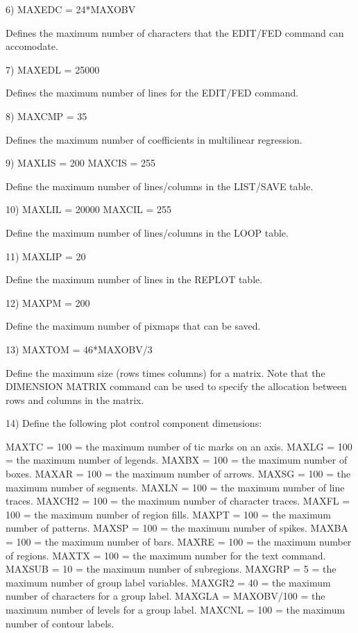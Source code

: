   6) MAXEDC   = 24*MAXOBV

     Defines the maximum number of characters that the EDIT/FED
     command can accomodate.

  7) MAXEDL   = 25000

     Defines the maximum number of lines for the EDIT/FED command.

  8) MAXCMP   = 35

     Defines the maximum number of coefficients in multilinear
     regression.

  9) MAXLIS   = 200
     MAXCIS   = 255

     Define the maximum number of lines/columns in the LIST/SAVE
     table.

 10) MAXLIL   = 20000
     MAXCIL   = 255

     Define the maximum number of lines/columns in the LOOP table.

 11) MAXLIP   = 20

     Define the maximum number of lines in the REPLOT table.

 12) MAXPM    = 200

     Define the maximum number of pixmaps that can be saved.

 13) MAXTOM   = 46*MAXOBV/3

     Define the maximum size (rows times columns) for a matrix.
     Note that the DIMENSION MATRIX command can be used to
     specify the allocation between rows and columns in the matrix.

 14) Define the following plot control component dimensions:

     MAXTC    = 100    = the maximum number of tic marks on an axis.
     MAXLG    = 100    = the maximum number of legends.
     MAXBX    = 100    = the maximum number of boxes.
     MAXAR    = 100    = the maximum number of arrows.
     MAXSG    = 100    = the maximum number of segments.
     MAXLN    = 100    = the maximum number of line traces.
     MAXCH2   = 100    = the maximum number of character traces.
     MAXFL    = 100    = the maximum number of region fills.
     MAXPT    = 100    = the maximum number of patterns.
     MAXSP    = 100    = the maximum number of spikes.
     MAXBA    = 100    = the maximum number of bars.
     MAXRE    = 100    = the maximum number of regions.
     MAXTX    = 100    = the maximum number for the text command.
     MAXSUB   = 10     = the maximum number of subregions.
     MAXGRP   = 5      = the maximum number of group label variables.
     MAXGR2   = 40     = the maximum number of characters for a group
                         label.
     MAXGLA   = MAXOBV/100  = the maximum number of levels for a
                              group label.
     MAXCNL   = 100    = the maximum number of contour labels.

